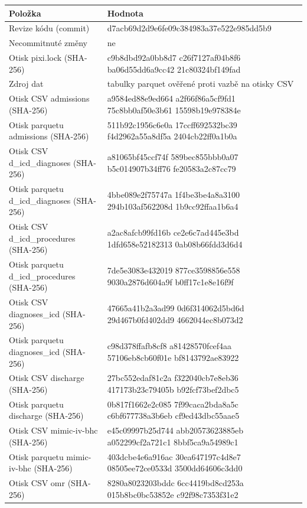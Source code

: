 \begin{tabular}{>{\raggedright\arraybackslash}p{}>{\raggedright\arraybackslash}p{}}
\toprule
Položka & Hodnota\\
\midrule
Revize kódu (commit) & d7acb69d2d9e6fe09c384983a37e522e985dd5b9\\
Necommitnuté změny & ne\\
Otisk pixi.lock (SHA-256) & c9b8dbd92a0bb8d7 c26f7127af04b8f6 ba06d55dd6a9cc42 21c80324bf149fad\\
Zdroj dat & tabulky parquet ověřené proti vazbě na otisky CSV\\
Otisk CSV admissions (SHA-256) & a9584ed88e9ed664 a2f66f86a5cf9fd1 75c8bb0af50e3b61 15598b19e978384e\\
Otisk parquetu admissions (SHA-256) & 511b92c1956c6e0a 17ccff692532bc39 f4d2962a55a8df5a 2404cb22ff0a1b0a\\
Otisk CSV d\_icd\_diagnoses (SHA-256) & a81065bf45ccf74f 589bec855bbb0a07 b5c014907b34ff76 fe20583a2c87cc79\\
Otisk parquetu d\_icd\_diagnoses (SHA-256) & 4bbe089e2f75747a 1f4be3be4a8a3100 294b103af562208d 1b9cc92ffaa1b6a4\\
Otisk CSV d\_icd\_procedures (SHA-256) & a2ac8afcb99fd16b ce2e6c7ad445e3bd 1dfd658e52182313 0ab08b66fdd3d6d4\\
Otisk parquetu d\_icd\_procedures (SHA-256) & 7de5e3083e432019 877ce3598856e558 9030a2876d604a9f b0ff17c1e8e16f9f\\
Otisk CSV diagnoses\_icd (SHA-256) & 47665a41b2a3ad99 0d6f314062d5bd6d 29d467b0fd402dd9 4662044ec8b073d2\\
Otisk parquetu diagnoses\_icd (SHA-256) & c98d378ffafb8cf8 a81428570fcef4aa 57106eb8cb60f01e bf8143792ae83922\\
Otisk CSV discharge (SHA-256) & 27bc552edaf81c2a f322040cb7e8eb36 417173b23c79405b b92fcf73bef2dbc5\\
Otisk parquetu discharge (SHA-256) & 0b817f1662e2c085 7f99caca2bda8a5c c6bf677738a3b6eb cf9ed43dbc55aae5\\
Otisk CSV mimic-iv-bhc (SHA-256) & e45c09997b25d744 abb20573623885eb a052299cf2a721c1 8bbf5ca9a54989c1\\
Otisk parquetu mimic-iv-bhc (SHA-256) & 403dcbe4e6a916ac 30ea647197c4d8e7 08505ee72ce0533d 3500dd64606c3dd0\\
Otisk CSV omr (SHA-256) & 8280a8023203bddc 6cc4419bd8cd253a 015b8bc0bc53852e c92f98c7353f31e2\\

\end{tabular}
